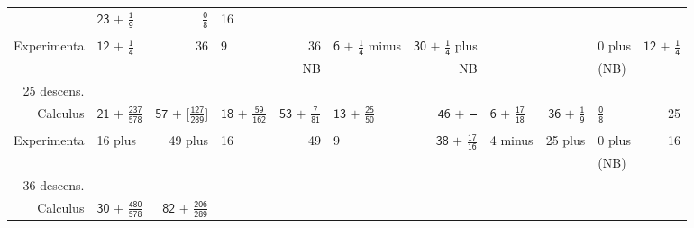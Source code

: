{\begin{tabular}{r|lr|lr|lr|lr|lr}
& 
\textsf{$ \textsf{23 + }\displaystyle\frac{\textsf{1}}{\textsf{9}} $}
& 
\textsf{$ \displaystyle\frac{\textsf{0}}{\textsf{8}} $}
& 
\textsf{16}
\\
& & & & & & & & & & 
\\
\textsf{Experimenta}
& 
\textsf{$ \textsf{12 + }\displaystyle\frac{\textsf{1}}{\textsf{4}} $}
& 
\textsf{36}
& 
\textsf{9}
& 
\textsf{36}
& 
\textsf{$ \textsf{6 + }\displaystyle\frac{\textsf{1}}{\textsf{4}} $ minus}
& 
\textsf{$ \textsf{30 + }\displaystyle\frac{\textsf{1}}{\textsf{4}}$ plus}
& 
& 
& 
\textsf{0 plus}
& 
\textsf{$ \textsf{12 + }\displaystyle\frac{\textsf{1}}{\textsf{4}} $}
\\
& & & & NB & & NB & & & (NB) &
\\
\hline
%
%
\rule[0mm]{0mm}{4mm}%
\textsf{25 descens.}
& & & & & & & & & & 
\\
\textsf{Calculus}
& 
\textsf{$ \textsf{21 + }\displaystyle\frac{\textsf{237}}{\textsf{578}} $}
& 
\textsf{$ \textsf{57 + [}\displaystyle\frac{\textsf{127}}{\textsf{289}}\textsf{]} $} %
& 
\textsf{$ \textsf{18 + }\displaystyle\frac{\textsf{59}}{\textsf{162}} $}
& 
\textsf{$ \textsf{53 + }\displaystyle\frac{\textsf{7}}{\textsf{81}} $}
& 
\textsf{$ \textsf{13 + }\displaystyle\frac{\textsf{25}}{\textsf{50}} $}
& 
\textsf{$ \textsf{46 + }\displaystyle\frac{\phantom{\textsf{m}}}{\phantom{\textsf{m}}} $}
& 
\textsf{$ \textsf{6 + }\displaystyle\frac{\textsf{17}}{\textsf{18}} $}
& 
\textsf{$ \textsf{36 + }\displaystyle\frac{\textsf{1}}{\textsf{9}} $}
& 
\textsf{$ \displaystyle\frac{\textsf{0}}{\textsf{8}} $}
& 
\textsf{25}
\\
& & & & & & & & & & 
\\
\textsf{Experimenta}
& 
\textsf{16 plus}
& 
\textsf{49 plus}
& 
\textsf{16}
& 
\textsf{49}
& 
\textsf{9}
& 
\textsf{$ \textsf{38 + }\displaystyle\frac{\textsf{17}}{\textsf{16}} $}
& 
\textsf{4 minus}
& 
\textsf{25 plus}
& 
\textsf{0 plus}
& 
\textsf{16}
\\
& & & & & & & & & (NB) & 
\\
\hline
%
%
%
%
\rule[0mm]{0mm}{4mm}%
\textsf{36 descens.}
& & & & & & & & & & 
\\
\textsf{Calculus}
& 
\textsf{$ \textsf{30 + }\displaystyle\frac{\textsf{480}}{\textsf{578}} $}
& 
\textsf{$ \textsf{82 + }\displaystyle\frac{\textsf{206}}{\textsf{289}} $}

\end{tabular}}
